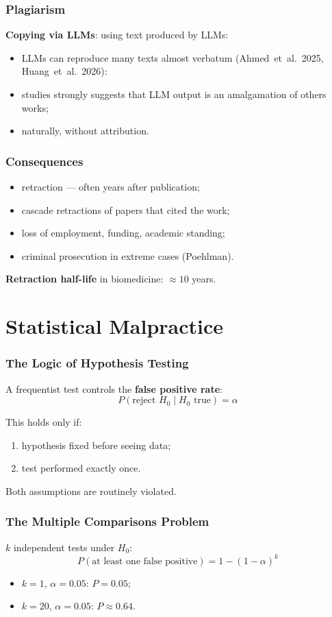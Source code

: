 \documentclass[]{beamer}
\begin{document}
\begin{frame}[fragile]
\frametitle{Plagiarism}
\textbf{Copying via LLMs}: using text produced by LLMs:
\begin{itemize}
  \item LLMs can reproduce many texts almost verbatum (Ahmed~et~al.~2025, Huang~et~al.~2026):
  \item studies strongly suggests that LLM output is an amalgamation of others works;
  \item naturally, without attribution.
\end{itemize}

\end{frame}

\begin{frame}[fragile]
\frametitle{Consequences}
\begin{itemize}
  \item retraction --- often years after publication;
  \item cascade retractions of papers that cited the work;
  \item loss of employment, funding, academic standing;
  \item criminal prosecution in extreme cases (Poehlman).
\end{itemize}

\textbf{Retraction half-life} in biomedicine: $\approx 10$ years.

\end{frame}

\section{Statistical Malpractice}

\begin{frame}[fragile]
\frametitle{The Logic of Hypothesis Testing}
A frequentist test controls the \textbf{false positive rate}:
$$P(\text{reject } H_0 \mid H_0 \text{ true}) = \alpha$$

This holds only if:
\begin{enumerate}
  \item hypothesis fixed before seeing data;
  \item test performed exactly once.
\end{enumerate}

Both assumptions are routinely violated.

\end{frame}

\begin{frame}[fragile]
\frametitle{The Multiple Comparisons Problem}
$k$ independent tests under $H_0$:
$$P(\text{at least one false positive}) = 1 - (1-\alpha)^k$$

\begin{itemize}
  \item $k = 1$, $\alpha = 0.05$: $P = 0.05$;
  \item $k = 20$, $\alpha = 0.05$: $P \approx 0.64$.
\end{itemize}

\end{frame}
\end{document}
